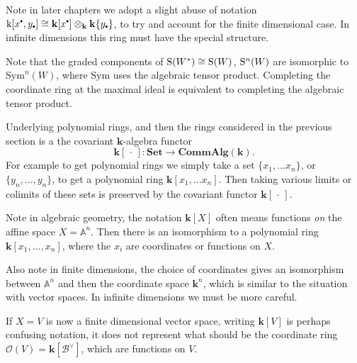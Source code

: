     
    \begin{rem}[Notation] Note in later chapters we adopt a slight abuse of notation \( \mathrm{k}[x^{\sbt},y_{\sbt} ] \cong \mathbf{k}[x^{\sbt}] \otimes_{\mathbf{k}}  \mathbf{k}\{y_{\sbt}\}  \), to try and account for the finite dimensional case. In infinite dimensions this ring must have the special structure.
    \end{rem} 
    
    \begin{rem} Note that the graded components of \( \mathrm{S}(W^*) \cong \mathrm{S}(W) \), \( \mathrm{S}^n(W)\)  are isomorphic to \( \mathrm{Sym}^{n}(W)\), where \( \mathrm{Sym}\) uses the algebraic tensor product. Completing the coordinate ring at the maximal ideal is equivalent to completing the algebraic tensor product.
    \end{rem}

    Underlying polynomial rings, and then the rings considered in the previous  section is a the covariant \( \mathbf{k}\)-algebra functor 
    \[ \mathbf{k}[\, \cdot \,] : \mathbf{Set} \rightarrow \mathbf{CommAlg}(\mathbf{k}).\]
    For example to get polynomial rings we simply take a set \( \{ x_1, \dots x_n\}\), or \( \{ y_n, \dots , y_n\} \), to get a polynomial ring \( \mathbf{k}[x_1, \dots x_n]\). Then taking various limits or colimits of these sets is preserved by the covariant functor \( \mathbf{k}[ \,\cdot\, ] \).
    \begin{rem}
    Note in algebraic geometry, the notation \(\mathbf{k}[X]\) often means functions \emph{on} the affine space \(X = \mathbb{A}^n\). Then there is an isomorphism to a polynomial ring \( \mathbf{k}[x_1, \dots , x_n]\), where the \(x_i\) are coordinates or functions on \(X\). 
    
    Also note in finite dimensions, the choice of coordinates gives an isomorphism between \( \mathbb{A}^n\) and then the coordinate space \( \mathbf{k}^n\), which is similar to the situation with vector spaces. In infinite dimensions we must be more careful.
    
    If \(X=V\) is now a finite dimensional vector space, writing \( \mathbf{k}[V]\) is perhaps confusing notation, it does not represent what should be the coordinate ring \(\mathcal{O}(V) = \mathbf{k}[ \mathcal{B}^{\vee}] \), which are functions on \(V\).
    \end{rem}
    
    

